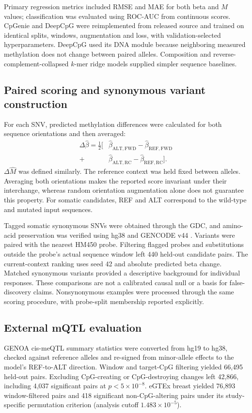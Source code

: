 \documentclass[11pt,letterpaper,twocolumn]{article}
\begin{document}
Primary regression metrics included RMSE and MAE for both beta and $M$ values; classification was evaluated using ROC-AUC from continuous scores. CpGenie and DeepCpG were reimplemented from released source and trained on identical splits, windows, augmentation and loss, with validation-selected hyperparameters. DeepCpG used its DNA module because neighboring measured methylation does not change between paired alleles. Composition and reverse-complement-collapsed $k$-mer ridge models supplied simpler sequence baselines.

\subsection{Paired scoring and synonymous variant construction}
For each SNV, predicted methylation differences were calculated for both sequence orientations and then averaged:
\begin{align*}
\Delta\widehat\beta=\tfrac12\big[&\widehat\beta_{\mathrm{ALT,FWD}}-\widehat\beta_{\mathrm{REF,FWD}}\\
+&\widehat\beta_{\mathrm{ALT,RC}}-\widehat\beta_{\mathrm{REF,RC}}\big].
\end{align*}
$\Delta\widehat M$ was defined similarly. The reference context was held fixed between alleles. Averaging both orientations makes the reported score invariant under their interchange, whereas random orientation augmentation alone does not guarantee this property. For somatic candidates, REF and ALT correspond to the wild-type and mutated input sequences.

Tagged somatic synonymous SNVs were obtained through the GDC, and amino-acid preservation was verified using hg38 and GENCODE v44 \cite{grossman2016gdc,frankish2021gencode}. Variants were paired with the nearest HM450 probe. Filtering flagged probes and substitutions outside the probe's actual sequence window left 440 held-out candidate pairs. The current-context ranking uses seed 42 and absolute predicted beta change. Matched synonymous variants provided a descriptive background for individual responses. These comparisons are not a calibrated causal null or a basis for false-discovery claims. Nonsynonymous examples were processed through the same scoring procedure, with probe-split membership reported explicitly.

\subsection{External mQTL evaluation}
GENOA cis-meQTL summary statistics \cite{shang2023genoa} were converted from hg19 to hg38, checked against reference alleles and re-signed from minor-allele effects to the model's REF-to-ALT direction. Window and target-CpG filtering yielded 66,495 held-out pairs. Excluding CpG-creating or CpG-destroying changes left 42,866, including 4,037 significant pairs at $p<5\times10^{-8}$. eGTEx breast \cite{oliva2023mqtl} yielded 76,893 window-filtered pairs and 418 significant non-CpG-altering pairs under its study-specific permutation criterion (analysis cutoff $1.483\times10^{-5}$).
\end{document}
